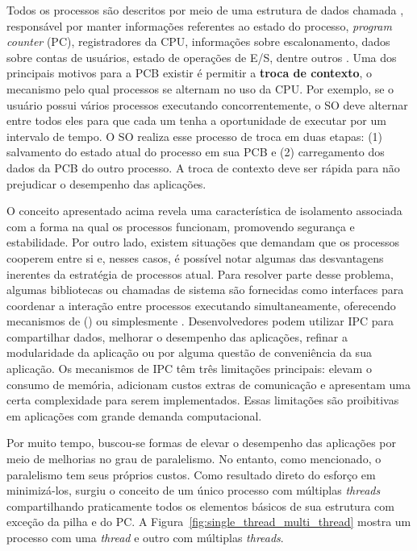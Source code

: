 Todos os processos são descritos por meio de uma estrutura de dados chamada
, responsável por manter informações
referentes ao estado do processo, \emph{program counter} (PC), registradores da
CPU, informações sobre escalonamento, dados sobre contas de usuários, estado de
operações de E/S, dentre outros \citep{silberschatz}.  Uma dos principais
motivos para a PCB existir é permitir a \textbf{troca de contexto}, o mecanismo
pelo qual processos se alternam no uso da CPU.  Por exemplo, se o usuário
possui vários processos executando concorrentemente, o SO deve alternar entre todos
eles para que cada um tenha a oportunidade de executar por um intervalo de
tempo. O SO realiza esse processo de troca em duas etapas: (1) salvamento do
estado atual do processo em sua PCB e (2) carregamento dos dados da PCB do
outro processo. A troca de contexto deve ser rápida para não prejudicar o desempenho das aplicações.

O conceito apresentado acima revela uma característica de isolamento associada
com a forma na qual os processos funcionam, promovendo segurança e
estabilidade.  Por outro lado, existem situações que demandam que os processos
cooperem entre si e, nesses casos, é possível notar algumas das desvantagens
inerentes da estratégia de processos atual. Para resolver parte desse problema,
algumas bibliotecas ou chamadas de sistema são fornecidas como interfaces para
coordenar a interação entre processos executando simultaneamente, oferecendo
mecanismos de 
() ou simplesmente .
Desenvolvedores podem utilizar IPC para compartilhar dados, melhorar o
desempenho das aplicações, refinar a modularidade da aplicação ou por alguma
questão de conveniência da sua aplicação. Os mecanismos de IPC têm três
limitações principais: elevam o consumo de memória, adicionam custos extras de
comunicação e apresentam uma certa complexidade para serem implementados. Essas
limitações são proibitivas em aplicações com grande demanda computacional.

Por muito tempo, buscou-se formas de elevar o desempenho das
aplicações por meio de melhorias no grau de paralelismo. No entanto, como
mencionado, o paralelismo tem seus próprios custos. Como resultado direto
do esforço em minimizá-los,
surgiu o conceito de um único processo com múltiplas \emph{threads}
compartilhando praticamente todos os elementos básicos de sua estrutura com exceção da
pilha e do PC. A Figura~\ref{fig:single_thread_multi_thread} mostra um
processo com uma \emph{thread} e outro com múltiplas \emph{threads}.

